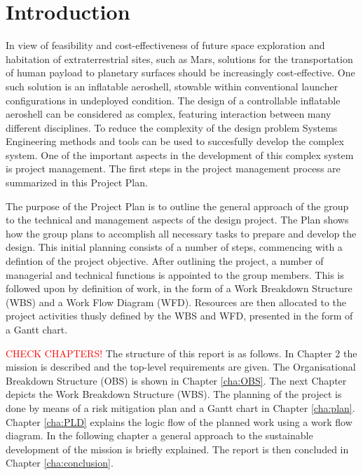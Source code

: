 \section{Introduction}\label{cha:introduction}
In view of feasibility and cost-effectiveness of future space exploration and habitation of extraterrestrial sites, such as Mars, solutions for the transportation of human payload to planetary surfaces should be increasingly cost-effective. One such solution is an inflatable aeroshell, stowable within conventional launcher configurations in undeployed condition. The design of a controllable inflatable aeroshell can be considered as complex, featuring interaction between many different disciplines. To reduce the complexity of the design problem Systems Engineering methods and tools can be used to succesfully develop the complex system. One of the important aspects in the development of this complex system is project management. The first steps in the project management process are summarized in this Project Plan.

The purpose of the Project Plan is to outline the general approach of the group to the technical and management aspects of the design project. The Plan shows how the group plans to accomplish all necessary tasks to prepare and develop the design. This initial planning consists of a number of steps, commencing with a defintion of the project objective. After outlining the project, a number of managerial and technical functions is appointed to the group members. This is followed upon by definition of work, in the form of a Work Breakdown Structure (WBS) and a Work Flow Diagram (WFD). Resources are then allocated to the project activities thusly defined by the WBS and WFD, presented in the form of a Gantt chart.

\textcolor{red}{CHECK CHAPTERS!}
The structure of this report is as follows. In Chapter 2 the mission is described and the top-level requirements are given. The Organisational Breakdown Structure (OBS) is shown in Chapter \ref{cha:OBS}. The next Chapter depicts the Work Breakdown Structure (WBS). The planning of the project is done by means of a risk mitigation plan and a Gantt chart in Chapter \ref{cha:plan}. Chapter \ref{cha:PLD} explains the logic flow of the planned work using a work flow diagram. In the following chapter a general approach to the sustainable development of the mission is briefly explained. The report is then concluded in Chapter \ref{cha:conclusion}.
